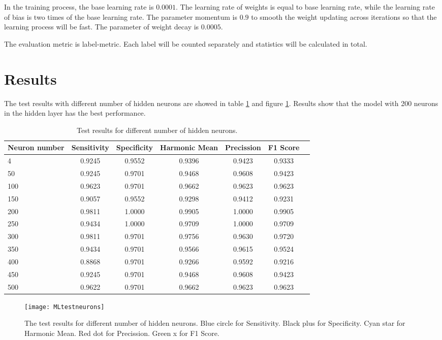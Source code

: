 In the training process, the base learning rate is $0.0001$. The learning rate of weights is equal to base learning rate, while the learning rate of bias is two times of the base learning rate. The parameter momentum is $0.9$ to smooth the weight updating across iterations so that the learning process will be fast. The parameter of weight decay is $0.0005$.

The evaluation metric is label-metric. Each label will be counted separately and statistics will be calculated in total.

\section{Results}

The test results with different number of hidden neurons are showed in table \ref{tb:tMLtestneurons} and figure \ref{fig:MLtestneurons}. Results show that the model with 200 neurons in the hidden layer has the best performance.
\begin{table}
\centering
\begin{tabular}{l*{6}{c}}
Neuron number              & Sensitivity & Specificity & Harmonic Mean & Precission & F1 Score  \\
\hline
4 				& 0.9245 & 0.9552 & 0.9396 & 0.9423 & 0.9333   \\
50              & 0.9245 & 0.9701 & 0.9468 & 0.9608 & 0.9423   \\
100             & 0.9623 & 0.9701 & 0.9662 & 0.9623 &  0.9623  \\
150             & 0.9057 & 0.9552 & 0.9298 & 0.9412 &  0.9231   \\
200             & 0.9811 & 1.0000 & 0.9905 & 1.0000 &  0.9905   \\
250             & 0.9434 & 1.0000 & 0.9709 & 1.0000 &  0.9709   \\
300             & 0.9811 & 0.9701 & 0.9756 & 0.9630 &  0.9720   \\
350             & 0.9434 & 0.9701 & 0.9566 & 0.9615 &  0.9524   \\
400             & 0.8868 & 0.9701 & 0.9266 & 0.9592 &  0.9216   \\
450             & 0.9245 & 0.9701 & 0.9468 & 0.9608 &  0.9423   \\
500             & 0.9622 & 0.9701 & 0.9662 & 0.9623 &  0.9623   \\
\end{tabular}
\caption{\label{tb:tMLtestneurons}Test results for different number of hidden neurons.}
\end{table}
\begin{figure}[htb]
\centering
\texttt{[image: MLtestneurons]}
\caption{\label{fig:MLtestneurons}The test results for different number of hidden neurons. Blue circle for Sensitivity. Black plus for Specificity. Cyan star for Harmonic Mean. Red dot for Precission. Green x for  F1 Score.}
\end{figure}


